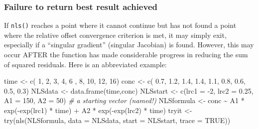 \documentclass[
]{article}
\newenvironment{Shaded}{\begin{snugshade}}{\end{snugshade}}
\newcommand{\AttributeTok}[1]{\textcolor[rgb]{0.77,0.63,0.00}{#1}}
\newcommand{\CommentTok}[1]{\textcolor[rgb]{0.56,0.35,0.01}{\textit{#1}}}
\newcommand{\ConstantTok}[1]{\textcolor[rgb]{0.00,0.00,0.00}{#1}}
\newcommand{\DecValTok}[1]{\textcolor[rgb]{0.00,0.00,0.81}{#1}}
\newcommand{\FloatTok}[1]{\textcolor[rgb]{0.00,0.00,0.81}{#1}}
\newcommand{\FunctionTok}[1]{\textcolor[rgb]{0.00,0.00,0.00}{#1}}
\newcommand{\NormalTok}[1]{#1}
\newcommand{\OtherTok}[1]{\textcolor[rgb]{0.56,0.35,0.01}{#1}}
\newcommand{\SpecialCharTok}[1]{\textcolor[rgb]{0.00,0.00,0.00}{#1}}
\begin{document}
\hypertarget{failure-to-return-best-result-achieved}{%
\subsubsection{Failure to return best result
achieved}\label{failure-to-return-best-result-achieved}}

If \texttt{nls()} reaches a point where it cannot continue but has not
found a point where the relative offset convergence criterion is met, it
may simply exit, especially if a ``singular gradient'' (singular
Jacobian) is found. However, this may occur AFTER the function has made
considerable progress in reducing the sum of squared residuals. Here is
an abbreviated example:

\begin{Shaded}
\begin{Highlighting}[]
\NormalTok{time }\OtherTok{\textless{}{-}} \FunctionTok{c}\NormalTok{( }\DecValTok{1}\NormalTok{,  }\DecValTok{2}\NormalTok{,  }\DecValTok{3}\NormalTok{,  }\DecValTok{4}\NormalTok{,  }\DecValTok{6}\NormalTok{ , }\DecValTok{8}\NormalTok{, }\DecValTok{10}\NormalTok{, }\DecValTok{12}\NormalTok{, }\DecValTok{16}\NormalTok{)}
\NormalTok{conc }\OtherTok{\textless{}{-}} \FunctionTok{c}\NormalTok{( }\FloatTok{0.7}\NormalTok{, }\FloatTok{1.2}\NormalTok{, }\FloatTok{1.4}\NormalTok{, }\FloatTok{1.4}\NormalTok{, }\FloatTok{1.1}\NormalTok{, }\FloatTok{0.8}\NormalTok{, }\FloatTok{0.6}\NormalTok{, }\FloatTok{0.5}\NormalTok{, }\FloatTok{0.3}\NormalTok{)}
\NormalTok{NLSdata }\OtherTok{\textless{}{-}} \FunctionTok{data.frame}\NormalTok{(time,conc)}
\NormalTok{NLSstart }\OtherTok{\textless{}{-}} \FunctionTok{c}\NormalTok{(}\AttributeTok{lrc1 =} \SpecialCharTok{{-}}\DecValTok{2}\NormalTok{, }\AttributeTok{lrc2 =} \FloatTok{0.25}\NormalTok{, }\AttributeTok{A1 =} \DecValTok{150}\NormalTok{, }\AttributeTok{A2 =} \DecValTok{50}\NormalTok{) }\CommentTok{\# a starting vector (named!)}
\NormalTok{NLSformula }\OtherTok{\textless{}{-}}\NormalTok{ conc }\SpecialCharTok{\textasciitilde{}}\NormalTok{ A1 }\SpecialCharTok{*} \FunctionTok{exp}\NormalTok{(}\SpecialCharTok{{-}}\FunctionTok{exp}\NormalTok{(lrc1) }\SpecialCharTok{*}\NormalTok{ time) }\SpecialCharTok{+}\NormalTok{ A2 }\SpecialCharTok{*} \FunctionTok{exp}\NormalTok{(}\SpecialCharTok{{-}}\FunctionTok{exp}\NormalTok{(lrc2) }\SpecialCharTok{*}\NormalTok{ time)}
\NormalTok{tryit }\OtherTok{\textless{}{-}} \FunctionTok{try}\NormalTok{(}\FunctionTok{nls}\NormalTok{(NLSformula, }\AttributeTok{data =}\NormalTok{ NLSdata, }\AttributeTok{start =}\NormalTok{ NLSstart, }\AttributeTok{trace =} \ConstantTok{TRUE}\NormalTok{))}
\end{Highlighting}
\end{Shaded}
\end{document}
